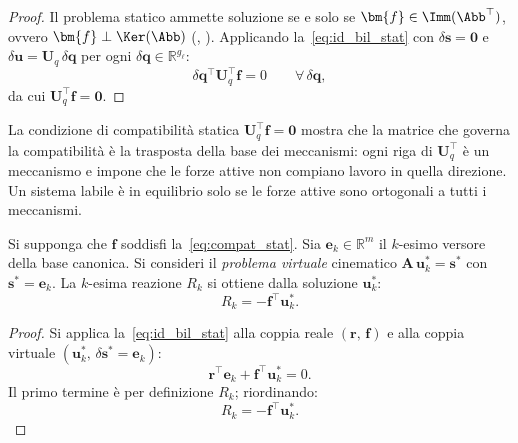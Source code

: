 \begin{proof}
	Il problema statico ammette soluzione se e solo se
	$\bm{f} \in \Imm(\Abb^{\top})$, ovvero $\bm{f} \perp
	\Ker(\Abb)$ (,
	). Applicando
	la~\eqref{eq:id_bil_stat} con $\delta\bm{s} = \bm{0}$
	e $\delta\bm{u} = \bm{U}_q\,\delta\bm{q}$ per ogni
	$\delta\bm{q} \in \mathbb{R}^{g_\ell}$:
	\begin{equation*}
		\delta\bm{q}^{\top}\bm{U}_q^{\top}\bm{f} = 0
		\qquad \forall\,\delta\bm{q},
	\end{equation*}
	da cui $\bm{U}_q^{\top}\bm{f} = \bm{0}$.
\end{proof}

\begin{oss}
	La condizione di compatibilità statica
	$\bm{U}_q^{\top}\bm{f} = \bm{0}$ mostra che la
	matrice che governa la compatibilità è la trasposta
	della base dei meccanismi: ogni riga di
	$\bm{U}_q^{\top}$ è un meccanismo e impone che le
	forze attive non compiano lavoro in quella direzione.
	Un sistema labile è in equilibrio solo se le forze
	attive sono ortogonali a tutti i meccanismi.
\end{oss}

\begin{corollario}
	\label{cor:TSV}
	\label{cor:cedimento}
	Si supponga che $\bm{f}$ soddisfi
	la~\eqref{eq:compat_stat}. Sia $\bm{e}_k \in
	\mathbb{R}^m$ il $k$-esimo versore della base canonica.
	Si consideri il \emph{problema virtuale} cinematico
	$\bm{A}\,\bm{u}^*_k = \bm{s}^*$ con
	$\bm{s}^* = \bm{e}_k$. La $k$-esima reazione
	$R_k$ si ottiene dalla soluzione $\bm{u}^*_k$:
	\begin{equation}\label{eq:mueller_breslau}
		R_k = -\bm{f}^{\top}\bm{u}^*_k.
	\end{equation}
\end{corollario}

\begin{proof}
	Si applica la~\eqref{eq:id_bil_stat} alla coppia reale
	$(\bm{r},\,\bm{f})$ e alla coppia virtuale
	$(\bm{u}^*_k,\,\delta\bm{s}^* = \bm{e}_k)$:
	\begin{equation}
		\bm{r}^{\top}\bm{e}_k +
		\bm{f}^{\top}\bm{u}^*_k = 0.
	\end{equation}
	Il primo termine è per definizione $R_k$; riordinando:
	\begin{equation}
		R_k = -\bm{f}^{\top}\bm{u}^*_k. 
	\end{equation}
\end{proof}

